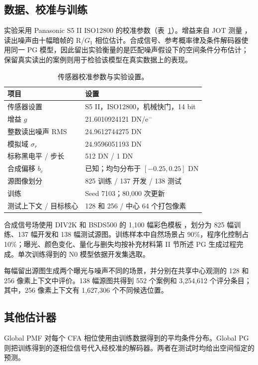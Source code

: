 \documentclass[10pt,twocolumn,journal]{IEEEtran}
\begin{document}
\subsection{数据、校准与训练}
实验采用 Panasonic S5 II ISO12800 的校准参数（表~\ref{tab:protocol}）。增益来自 JOT 测量 \cite{jot}，读出噪声由十幅暗帧的 R/$G_1$ 相位估计。合成信号、参考概率律及条件解码器使用同一 PG 模型，因此留出实验衡量的是匹配噪声假设下的空间条件分布估计；保留真实读出的案例则用于检验该模型在真实数据上的表现。

\begin{table}[t]
\centering\small
\caption{传感器校准参数与实验设置。}
\label{tab:protocol}
\begin{tabular}{@{}p{}p{}@{}}
\toprule
项目 & 设置\\
\midrule
传感器设置 & S5 II，ISO12800，机械快门，14 bit\\
增益 $g$ & 21.6010924121 DN/e$^{-}$\\
整数读出噪声 RMS & 24.9612744275 DN\\
模拟域 $\sigma_r$ & 24.9596051193 DN\\
标称黑电平 / 步长 & 512 DN / 1 DN\\
合成偏移 $b_c$ & 已知；均匀分布于 $[-0.25,0.25]$ DN\\
源图像划分 & 825 训练 / 137 开发 / 138 测试\\
训练 & Seed 7103；80,000 次更新\\
测试上下文 / 目标核心 & 128 和 256 / 中心 64 个打包像素\\
\bottomrule
\end{tabular}
\end{table}

合成信号场使用 DIV2K 和 BSDS500 的 1,100 幅彩色模板 \cite{div2k,bsds500}，划分为 825 幅训练、137 幅开发和 138 幅测试源图。训练样本中自然场景占 90\%，程序化控制占 10\%；曝光、颜色变化、量化与删失均按补充材料第 II 节所述 PG 生成过程完成。单次训练得到的 N0 模型依据开发集选取。

每幅留出源图生成两个曝光与噪声不同的场景，并分别在共享中心观测的 128 和 256 像素上下文中评价。138 幅源图共得到 552 个案例和 3,254,612 个评分条目；其中，256 像素上下文有 1,627,306 个不同候选位置。






\subsection{其他估计器}\label{sec:baselines}
Global PMF 对每个 CFA 相位使用由训练数据得到的平均条件分布。Global PG 则把训练得到的逐相位信号代入经校准的解码器。两者在测试时均给出空间恒定的预测。
\end{document}
